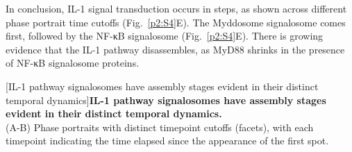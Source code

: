 In conclusion, IL-1 signal transduction occurs in steps, as shown across different phase portrait time cutoffs (Fig.~\ref{p2:S4}E). The Myddosome signalosome comes first, followed by the NF-κB signalosome (Fig.~\ref{p2:S4}E). There is growing evidence that the IL-1 pathway disassembles, as MyD88 shrinks in the presence of NF-κB signalosome proteins.


\begin{centering}
\captionsetup{parbox=none}
[IL-1 pathway signalosomes have assembly stages evident in their distinct temporal dynamics]{\textbf{IL-1 pathway signalosomes have assembly stages evident in their distinct temporal dynamics.}
\vspace{1em}
\\
(A-B) Phase portraits with distinct timepoint cutoffs (facets), with each timepoint indicating the time elapsed since the appearance of the first spot.
\vspace{1em}
}
\end{centering}
